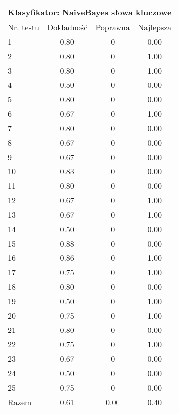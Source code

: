 \documentclass[notitlepage,leqno,fleqn,a4paper]{article}
\begin{document}
\begin{tabular}{|l|c|c|c|}
\hline
\multicolumn{4}{|c|}{Klasyfikator: NaiveBayes słowa kluczowe}\\
\hline
Nr. testu & Dokładność & Poprawna & Najlepsza\\
\hline
1 & 0.80 & 0 & 0.00 \\
2 & 0.80 & 0 & 1.00 \\
3 & 0.80 & 0 & 1.00 \\
4 & 0.50 & 0 & 0.00 \\
5 & 0.80 & 0 & 0.00 \\
6 & 0.67 & 0 & 1.00 \\
7 & 0.80 & 0 & 0.00 \\
8 & 0.67 & 0 & 0.00 \\
9 & 0.67 & 0 & 0.00 \\
10 & 0.83 & 0 & 0.00 \\
11 & 0.80 & 0 & 0.00 \\
12 & 0.67 & 0 & 1.00 \\
13 & 0.67 & 0 & 1.00 \\
14 & 0.50 & 0 & 0.00 \\
15 & 0.88 & 0 & 0.00 \\
16 & 0.86 & 0 & 1.00 \\
17 & 0.75 & 0 & 1.00 \\
18 & 0.80 & 0 & 0.00 \\
19 & 0.50 & 0 & 1.00 \\
20 & 0.75 & 0 & 1.00 \\
21 & 0.80 & 0 & 0.00 \\
22 & 0.75 & 0 & 1.00 \\
23 & 0.67 & 0 & 0.00 \\
24 & 0.50 & 0 & 0.00 \\
25 & 0.75 & 0 & 0.00 \\
\hline
Razem & 0.61 & 0.00 & 0.40 \\
\hline
\end{tabular}
\end{document}

